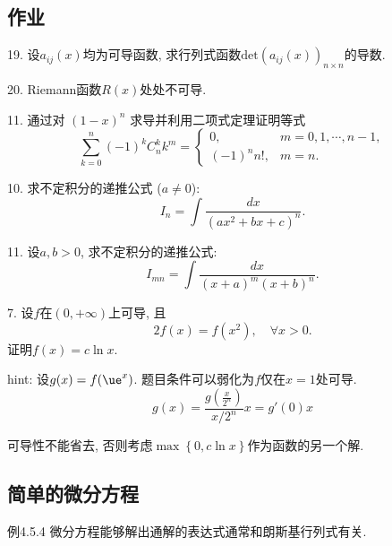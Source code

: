 \subsection{作业}

19. 设$a_{ij}(x)$均为可导函数, 求行列式函数$\mathrm{det}\left(a_{ij}(x)\right)_{n\times n}$的导数.

20. Riemann函数$R(x)$处处不可导.

11. 通过对 $(1-x)^{n}$ 求导并利用二项式定理证明等式 
\[
\sum_{k=0}^{n}(-1)^{k}C_{n}^{k}k^{m}=\begin{cases}
	0, & m=0,1,\cdots,n-1,\\
	(-1)^{n}n!, & m=n.
\end{cases}
\]

10. 求不定积分的递推公式 ($a\ne0$):
\[
I_{n}=\int\frac{dx}{(ax^{2}+bx+c)^{n}}.
\]

11. 设$a,b>0$, 求不定积分的递推公式:
\[
I_{mn}=\int\frac{dx}{(x+a)^{m}(x+b)^{n}}.
\]

7. 设$f$在$(0,+\infty)$上可导, 且
\[
2f(x)=f(x^{2}),\quad\forall x>0.
\]
证明$f(x)=c\ln x$.

hint: 设$g(x)=f(\ue^{x})$. 题目条件可以弱化为$f$仅在$x=1$处可导. 
\[
g(x)=\frac{g\left(\frac{x}{2^{n}}\right)}{x/2^{n}}x=g'(0)x
\]

可导性不能省去, 否则考虑$\max\left\{ 0,c\ln x\right\} $作为函数的另一个解.

\subsection{简单的微分方程}

例4.5.4 微分方程能够解出通解的表达式通常和朗斯基行列式有关.